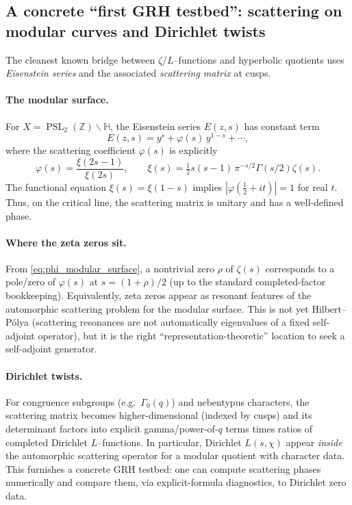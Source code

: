\documentclass[11pt,oneside]{amsbook}
\numberwithin{equation}{section}
\theoremstyle{plain}
\theoremstyle{definition}
\theoremstyle{remark}
\newcommand{\HH}{\mathbb{H}}
\newcommand{\Z}{\mathbb{Z}}
\DeclareMathOperator{\PSL}{\mathrm{PSL}}
\begin{document}
\subsection{A concrete ``first GRH testbed'': scattering on modular curves and Dirichlet twists}
\label{sec:scattering_dirichlet}

The cleanest known bridge between $\zeta$/$L$--functions and hyperbolic quotients uses \emph{Eisenstein series} and the associated \emph{scattering matrix} at cusps.

\paragraph{The modular surface.}
For $X=\PSL_2(\Z)\backslash\HH$, the Eisenstein series $E(z,s)$ has constant term
\[
E(z,s)=y^s+\varphi(s)\,y^{1-s}+\cdots,
\]
where the scattering coefficient $\varphi(s)$ is explicitly
\begin{equation}
\label{eq:phi_modular_surface}
\varphi(s)=\frac{\xi(2s-1)}{\xi(2s)},
\qquad \xi(s)=\tfrac12 s(s-1)\,\pi^{-s/2}\Gamma(s/2)\zeta(s).
\end{equation}
The functional equation $\xi(s)=\xi(1-s)$ implies $|\varphi(\tfrac12+it)|=1$ for real $t$.
Thus, on the critical line, the scattering matrix is unitary and has a well-defined phase.

\paragraph{Where the zeta zeros sit.}
From \eqref{eq:phi_modular_surface}, a nontrivial zero $\rho$ of $\zeta(s)$ corresponds to a pole/zero of $\varphi(s)$ at $s=(1+\rho)/2$ (up to the standard completed-factor bookkeeping).
Equivalently, zeta zeros appear as resonant features of the automorphic scattering problem for the modular surface.
This is not yet Hilbert--Pólya (scattering resonances are not automatically eigenvalues of a fixed self-adjoint operator), but it is the right ``representation-theoretic'' location to seek a self-adjoint generator.

\paragraph{Dirichlet twists.}
For congruence subgroups (e.g.\ $\Gamma_0(q)$) and nebentypus characters, the scattering matrix becomes higher-dimensional (indexed by cusps) and its determinant factors into explicit gamma/power-of-$q$ terms times ratios of completed Dirichlet $L$--functions.
In particular, Dirichlet $L(s,\chi)$ appear \emph{inside} the automorphic scattering operator for a modular quotient with character data.
This furnishes a concrete GRH testbed: one can compute scattering phases numerically and compare them, via explicit-formula diagnostics, to Dirichlet zero data.
\end{document}
